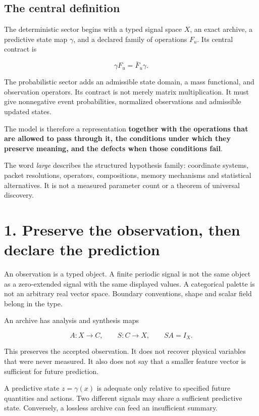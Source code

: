 \documentclass[11pt,letterpaper]{article}
\begin{document}
\subsection{The central definition}\label{the-central-definition}

The deterministic sector begins with a typed signal space \(X\), an
exact archive, a predictive state map \(\gamma\), and a declared family
of operations \(F_u\). Its central contract is

\[
\gamma F_u=\bar F_u\gamma.
\]

The probabilistic sector adds an admissible state domain, a mass
functional, and observation operators. Its contract is not merely matrix
multiplication. It must give nonnegative event probabilities, normalized
observations and admissible updated states.

The model is therefore a representation \textbf{together with the
operations that are allowed to pass through it, the conditions under
which they preserve meaning, and the defects when those conditions
fail}.

The word \emph{large} describes the structured hypothesis family:
coordinate systems, packet resolutions, operators, compositions, memory
mechanisms and statistical alternatives. It is not a measured parameter
count or a theorem of universal discovery.

\section{1. Preserve the observation, then declare the
prediction}\label{preserve-the-observation-then-declare-the-prediction}

An observation is a typed object. A finite periodic signal is not the
same object as a zero-extended signal with the same displayed values. A
categorical palette is not an arbitrary real vector space. Boundary
conventions, shape and scalar field belong in the type.

An archive has analysis and synthesis maps

\[
A:X\to C,\qquad S:C\to X,\qquad SA=I_X.
\]

This preserves the accepted observation. It does not recover physical
variables that were never measured. It also does not say that a smaller
feature vector is sufficient for future prediction.

A predictive state \(z=\gamma(x)\) is adequate only relative to
specified future quantities and actions. Two different signals may share
a sufficient predictive state. Conversely, a lossless archive can feed
an insufficient summary.
\end{document}
